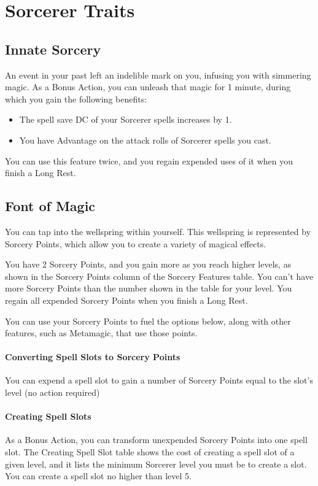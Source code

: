 \documentclass[letterpaper,openany,oneside,twocolumn]{book}
\begin{document}
\section*{Sorcerer Traits}
\subsection*{Innate Sorcery}
An event in your past left an indelible mark on you, infusing you with simmering magic. As a Bonus Action, you can unleash that magic for 1 minute, during which you gain the following benefits:
\begin{itemize}
	\item The spell save DC of your Sorcerer spells increases by 1.
	\item You have Advantage on the attack rolls of Sorcerer spells you cast.
\end{itemize}
You can use this feature twice, and you regain expended uses of it when you finish a Long Rest.
\vfill\eject
\subsection*{Font of Magic}
You can tap into the wellspring within yourself. This wellspring is represented by Sorcery Points, which allow you to create a variety of magical effects.

You have 2 Sorcery Points, and you gain more as you reach higher levels, as shown in the Sorcery Points column of the Sorcery Features table. You can't have more Sorcery Points than the number shown in the table for your level. You regain all expended Sorcery Points when you finish a Long Rest.

You can use your Sorcery Points to fuel the options below, along with other features, such as Metamagic, that use those points.

\paragraph*{Converting Spell Slots to Sorcery Points} You can expend a spell slot to gain a number of Sorcery Points equal to the slot's level (no action required)

\paragraph*{Creating Spell Slots} As a Bonus Action, you can transform unexpended Sorcery Points into one spell slot. The Creating Spell Slot table shows the cost of creating a spell slot of a given level, and it lists the minimum Sorcerer level you must be to create a slot. You can create a spell slot no higher than level 5.
\end{document}
